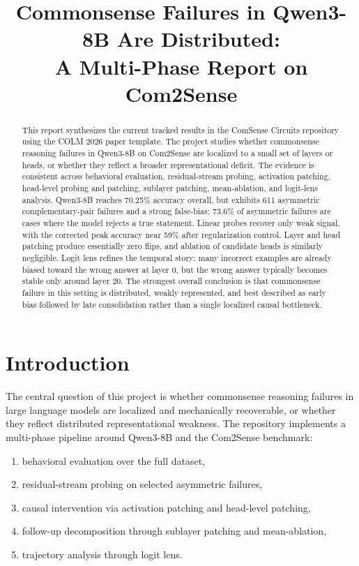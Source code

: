 \documentclass{article}
\title{Commonsense Failures in Qwen3-8B Are Distributed:\\
A Multi-Phase Report on Com2Sense}
\author{}
\begin{document}
\maketitle

\begin{abstract}
This report synthesizes the current tracked results in the ComSense Circuits repository using the COLM 2026 paper template. The project studies whether commonsense reasoning failures in Qwen3-8B on Com2Sense are localized to a small set of layers or heads, or whether they reflect a broader representational deficit. The evidence is consistent across behavioral evaluation, residual-stream probing, activation patching, head-level probing and patching, sublayer patching, mean-ablation, and logit-lens analysis. Qwen3-8B reaches 70.25\% accuracy overall, but exhibits 611 asymmetric complementary-pair failures and a strong false-bias: 73.6\% of asymmetric failures are cases where the model rejects a true statement. Linear probes recover only weak signal, with the corrected peak accuracy near 59\% after regularization control. Layer and head patching produce essentially zero flips, and ablation of candidate heads is similarly negligible. Logit lens refines the temporal story: many incorrect examples are already biased toward the wrong answer at layer 0, but the wrong answer typically becomes stable only around layer 20. The strongest overall conclusion is that commonsense failure in this setting is distributed, weakly represented, and best described as early bias followed by late consolidation rather than a single localized causal bottleneck.
\end{abstract}

\section{Introduction}

The central question of this project is whether commonsense reasoning failures in large language models are localized and mechanically recoverable, or whether they reflect distributed representational weakness. The repository implements a multi-phase pipeline around Qwen3-8B and the Com2Sense benchmark:

\begin{enumerate}
\item behavioral evaluation over the full dataset,
\item residual-stream probing on selected asymmetric failures,
\item causal intervention via activation patching and head-level patching,
\item follow-up decomposition through sublayer patching and mean-ablation,
\item trajectory analysis through logit lens.
\end{enumerate}
\end{document}
